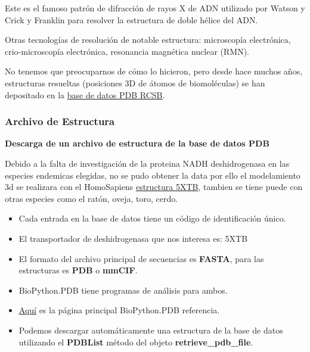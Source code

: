 \documentclass[a4paper]{article}
\begin{document}
Este es el famoso patrón de difracción de rayos X de ADN utilizado por Watson y Crick y Franklin para resolver la estructura de doble hélice del ADN.

\noindent Otras tecnologías de resolución de notable estructura: microscopía electrónica, crio-microscopía electrónica, resonancia magnética nuclear (RMN).

\noindent No tenemos que preocuparnos de cómo lo hicieron, pero desde hace muchos años, estructuras resueltas (posiciones 3D de átomos de biomoléculas) se han depositado en la \href{https://www.rcsb.org/}{\underline{base de datos PDB RCSB}}.

\subsubsection{Archivo de Estructura}

\textbf{Descarga de un archivo de estructura de la base de datos PDB}

Debido a la falta de investigación de la proteina NADH deshidrogenasa en las especies endemicas elegidas, no se pudo obtener la data por ello el modelamiento 3d se realizara con el HomoSapiens \href{https://www.rcsb.org/structure/5XTB}{\underline{estructura 5XTB}}, tambien se tiene puede con otras especies como el ratón, oveja, toro, cerdo.

\begin{itemize}


\item Cada entrada en la base de datos tiene un código de identificación único.

\item El transportador de deshidrogenasa que nos interesa es: 5XTB

\item El formato del archivo principal de secuencias es \textbf{FASTA}, para las estructuras es \textbf{PDB} o \textbf{mmCIF}.

\item BioPython.PDB tiene programas de análisis para ambos.

\item \href{https://biopython.org/wiki/The_Biopython_Structural_Bioinformatics_FAQ}{\underline{Aquí}} es la página principal BioPython.PDB referencia.

\item Podemos descargar automáticamente una estructura de la base de datos utilizando el \textbf{PDBList} método del objeto \textbf{retrieve\_pdb\_file}.
	
\end{itemize}
\end{document}
